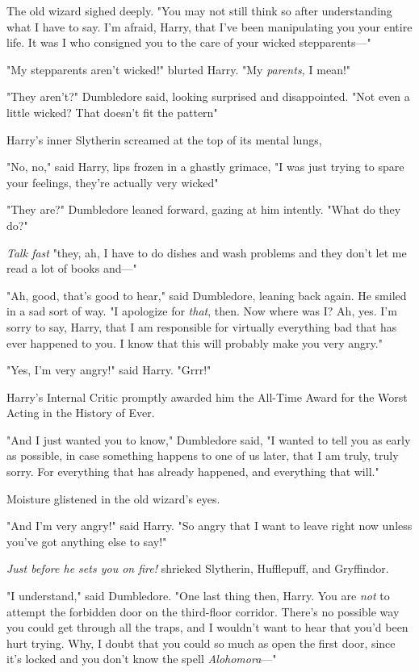 The old wizard sighed deeply. "You may not still think so after understanding
what I have to say. I'm afraid, Harry, that I've been manipulating you your
entire life. It was I who consigned you to the care of your wicked
stepparents\mbox{---}"

"My stepparents aren't wicked!" blurted Harry. "My \emph{parents,} I mean!"

"They aren't?" Dumbledore said, looking surprised and disappointed. "Not even a
little wicked? That doesn't fit the pattern{\el}"

Harry's inner Slytherin screamed at the top of its mental lungs, \emph{}

"No, no," said Harry, lips frozen in a ghastly grimace, "I was just trying to
spare your feelings, they're actually very wicked{\el}"

"They are?" Dumbledore leaned forward, gazing at him intently. "What do they
do?"

\emph{Talk fast} "they, ah, I have to do dishes and wash problems and they
don't let me read a lot of books and\mbox{---}"

"Ah, good, that's good to hear," said Dumbledore, leaning back again. He smiled
in a sad sort of way. "I apologize for \emph{that}, then. Now where was I? Ah,
yes. I'm sorry to say, Harry, that I am responsible for virtually everything
bad that has ever happened to you. I know that this will probably make you very
angry."

"Yes, I'm very angry!" said Harry. "Grrr!"

Harry's Internal Critic promptly awarded him the All-Time Award for the Worst
Acting in the History of Ever.

"And I just wanted you to know," Dumbledore said, "I wanted to tell you as
early as possible, in case something happens to one of us later, that I am
truly, truly sorry. For everything that has already happened, and everything
that will."

Moisture glistened in the old wizard's eyes.

"And I'm very angry!" said Harry. "So angry that I want to leave right now
unless you've got anything else to say!"

\emph{Just  before he sets you on fire!} shrieked Slytherin, Hufflepuff, and
Gryffindor.

"I understand," said Dumbledore. "One last thing then, Harry. You are
\emph{not} to attempt the forbidden door on the third-floor corridor. There's
no possible way you could get through all the traps, and I wouldn't want to
hear that you'd been hurt trying. Why, I doubt that you could so much as open
the first door, since it's locked and you don't know the spell
\emph{Alohomora}\mbox{---}"

